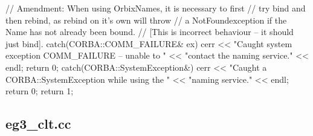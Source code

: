 \documentclass[11pt,twoside,a4paper]{book}
\begin{document}
\begin{cxxlisting}
{{    // Amendment: When using OrbixNames, it is necessary to first
    // try bind and then rebind, as rebind on it's own will throw
    // a NotFoundexception if the Name has not already been bound.
    // [This is incorrect behaviour -- it should just bind].
  }
  catch(CORBA::COMM_FAILURE& ex) {
    cerr << "Caught system exception COMM_FAILURE -- unable to "
         << "contact the naming service." << endl;
    return 0;
  }
  catch(CORBA::SystemException&) {
    cerr << "Caught a CORBA::SystemException while using the "
         << "naming service." << endl;
    return 0;
  }
  return 1;
}
\end{cxxlisting}


\clearpage
\subsection{eg3\_clt.cc}
\end{document}
